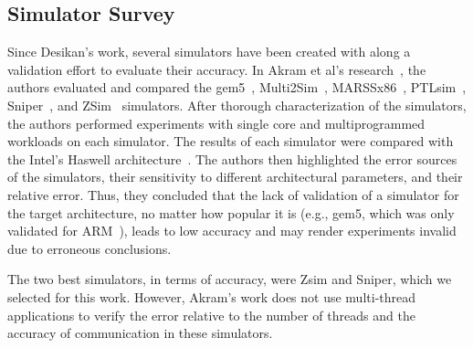 \documentclass[AMA,final,STIX1COL]{WileyNJD-v2}
\newcommand{\ms}[1]{\textcolor{orange}{\bfseries \ul{ msserpa: #1} }\vspace{0.2cm}}
\newcommand{\fbm}[1]{\textcolor{red}{\bfseries \ul{fbm: #1} }\vspace{0.2cm}}
\begin{document}
\subsection{Simulator Survey} 

Since Desikan's work, several simulators have been created with along a validation effort to evaluate their accuracy.
In Akram et al's research~\cite{akram2019survey}, the authors evaluated and compared the gem5~\cite{binkert2011gem5}, Multi2Sim~\cite{ubal2012multi2sim}, MARSSx86~\cite{patel2011marss}, PTLsim~\cite{yourst2007ptlsim}, Sniper~\cite{carlson2014aeohmcm}, and ZSim~\cite{sanchez2013zsim} simulators. 
After thorough characterization of the simulators, the authors performed experiments with single core and multiprogrammed workloads on each simulator. 
The results of each simulator were compared with the Intel's Haswell architecture~\cite{hammarlund2014haswell}. 
The authors then highlighted the error sources of the simulators, their sensitivity to different architectural parameters, and their relative error. 
Thus, they concluded that the lack of validation of a simulator for the target architecture, no matter how popular it is (e.g., gem5, which was only validated for ARM~\cite{gutierrez2014sources}), leads to low accuracy and may render experiments invalid due to erroneous conclusions.

The two best simulators, in terms of accuracy, were Zsim and Sniper, which we selected for this work.
However, Akram's work does not use multi-thread applications to verify the error relative to the number of threads and the accuracy of communication in these simulators.




\end{document}
